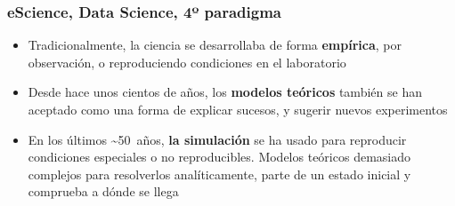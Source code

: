 \documentclass[14pt]{beamer}
\begin{document}

\begin{frame}
  \frametitle{eScience, Data Science, 4º paradigma}
  \begin{itemize}
  \item Tradicionalmente, la ciencia se desarrollaba de forma {\bf
      empírica}, por observación, o reproduciendo condiciones en el
    laboratorio
  \item Desde hace unos cientos de años, los {\bf modelos teóricos} también
    se han aceptado como una forma de explicar sucesos, y sugerir nuevos
    experimentos
  \item En los últimos \~{}50~años, {\bf la simulación} se ha usado para
    reproducir condiciones especiales o no reproducibles. Modelos
    teóricos demasiado complejos para resolverlos analíticamente,
    parte de un estado inicial y comprueba a dónde se llega
  \end{itemize}
\end{frame}
\end{document}
